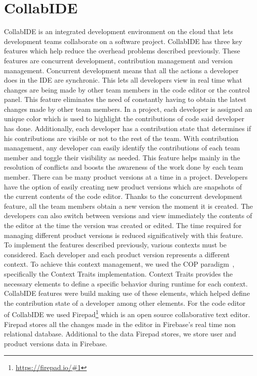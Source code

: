 \documentclass[10pt, conference]{IEEEtran}
\begin{document}
\section{CollabIDE}
\label{sec:collab-ide}

CollabIDE is an integrated development environment on the cloud that lets development teams 
collaborate on a software project. CollabIDE has three key features which help reduce the overhead 
problems described previously. These features are concurrent development, contribution management 
and version management.
Concurrent development means that all the actions a developer does in the IDE are synchronic. This 
lets all developers view in real time what changes are being made by other team members in the code 
editor or the control panel. This feature eliminates the need of constantly having to obtain the latest 
changes made by other team members. 
In a project, each developer is assigned an unique color which is used to highlight the contributions of 
code said developer has done. Additionally, each developer has a contribution state that determines if 
his contributions are visible or not to the rest of the team. With contribution management, any 
developer can easily identify the contributions of each team member and toggle their visibility as 
needed. This feature helps mainly in the resolution of conflicts and boosts the awareness of the work 
done by each team member.
There can be many product versions at a time in a project. Developers have the option of easily 
creating new product versions which are snapshots of the current contents of the code editor. Thanks 
to the concurrent development feature, all the team members obtain a new version the moment it is 
created. The developers can also switch between versions and view immediately the contents of the 
editor at the time the version was created or edited. The time required for managing different product 
versions is reduced significatively with this feature.
To implement the features described previously, various contexts must be considered. Each developer 
and each product version represents a different context. To achieve this context management, we used 
the \ac{COP} paradigm~\cite{salvaneschi+12survey}, specifically the Context Traits implementation. 
Context Traits provides the necessary elements to define a specific behavior during runtime for each 
context. CollabIDE features were build making use of these elements, which helped define the 
contribution state of a developer among other elements.
For the code editor of CollabIDE we used Firepad\footnote{\url{https://firepad.io/\#1}} which is an open 
source collaborative text editor. Firepad stores all the changes made in the editor in Firebase’s real 
time non relational database. Additional to the data Firepad stores, we store user and product versions 
data in Firebase.
\end{document}

